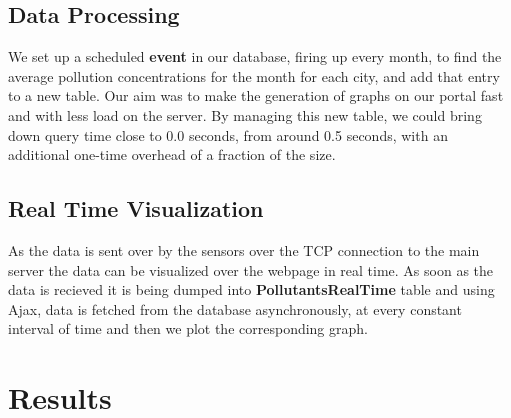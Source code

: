 \documentclass[twocolumn]{article}
\newcommand{\comment}[1]{}
\begin{document}
\subsection{Data Processing}
We set up a scheduled \textbf{event} in our database, firing up every month, to find the average pollution concentrations for the month for each city, and add that entry to a new table. Our aim was to make the generation of graphs on our portal fast and with less load on the server. By managing this new table, we could bring down query time close to 0.0 seconds, from around 0.5 seconds, with an additional one-time overhead of a fraction of the size.


\comment{

Use the following format for figures:

\begin{figure}[t]
	\centering
	\texttt{[image: figure\_file]}
	\caption{This figure explains this.}
	\label{fig:block}
\end{figure}

And refer as Figure \ref{fig:block}.

}

\subsection{Real Time Visualization}
As the data is sent over by the sensors over the TCP connection to the main server the data can be visualized over the webpage in real time. As soon as the data is recieved it is being dumped into \textbf{PollutantsRealTime} table and using Ajax\cite{ajax}, data is fetched from the database asynchronously, at every constant interval of time and then we plot the corresponding graph. 
\section{Results}
\end{document}

